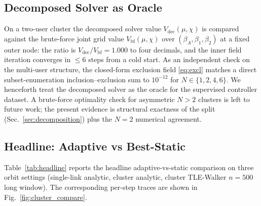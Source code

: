 \subsection{Decomposed Solver as Oracle}\label{sec:results:oracle}

On a two-user cluster the decomposed solver value $V_{\mathrm{dec}}(\mu,\chi)$ is compared against the brute-force joint grid value $V_{\mathrm{bf}}(\mu,\chi)$ over $(\beta_A, \beta_1, \beta_2)$ at a fixed outer node: the ratio is $V_{\mathrm{dec}}/V_{\mathrm{bf}} = 1.000$ to four decimals, and the inner field iteration converges in $\le 6$ steps from a cold start. As an independent check on the multi-user structure, the closed-form exclusion field \eqref{eq:excl} matches a direct subset-enumeration inclusion--exclusion sum to $10^{-12}$ for $N\in\{1,2,4,6\}$. We henceforth treat the decomposed solver as the oracle for the supervised controller dataset. A brute-force optimality check for asymmetric $N>2$ clusters is left to future work; the present evidence is structural exactness of the split (Sec.~\ref{sec:decomposition}) plus the $N{=}2$ numerical agreement.

\subsection{Headline: Adaptive vs Best-Static}\label{sec:results:headline}

Table~\ref{tab:headline} reports the headline adaptive-vs-static comparison on three orbit settings (single-link analytic, cluster analytic, cluster TLE-Walker $n{=}500$ long window). The corresponding per-step traces are shown in Fig.~\ref{fig:cluster_compare}.

